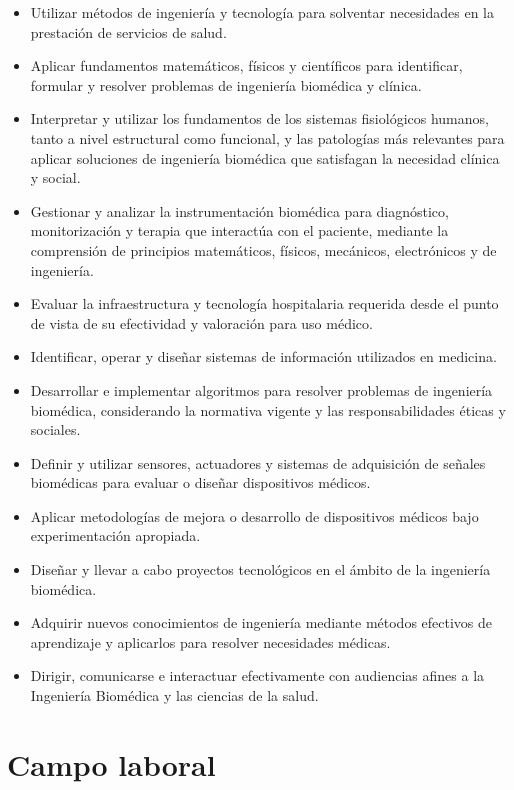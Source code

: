 \documentclass[10pt,letterpaper]{article}
\begin{document}
\begin{itemize}
  \item Utilizar métodos de ingeniería y tecnología para solventar necesidades en la prestación de servicios de salud.
  \item Aplicar fundamentos matemáticos, físicos y científicos para identificar, formular y resolver problemas de ingeniería biomédica y clínica.
  \item Interpretar y utilizar los fundamentos de los sistemas fisiológicos humanos, tanto a nivel estructural como funcional, y las patologías más relevantes para aplicar soluciones de ingeniería biomédica que satisfagan la necesidad clínica y social.
  \item Gestionar y analizar la instrumentación biomédica para diagnóstico, monitorización y terapia que interactúa con el paciente, mediante la comprensión de principios matemáticos, físicos, mecánicos, electrónicos y de ingeniería.
  \item Evaluar la infraestructura y tecnología hospitalaria requerida desde el punto de vista de su efectividad y valoración para uso médico.
  \item Identificar, operar y diseñar sistemas de información utilizados en medicina.
  \item Desarrollar e implementar algoritmos para resolver problemas de ingeniería biomédica, considerando la normativa vigente y las responsabilidades éticas y sociales.
  \item Definir y utilizar sensores, actuadores y sistemas de adquisición de señales biomédicas para evaluar o diseñar dispositivos médicos.
  \item Aplicar metodologías de mejora o desarrollo de dispositivos médicos bajo experimentación apropiada.
  \item Diseñar y llevar a cabo proyectos tecnológicos en el ámbito de la ingeniería biomédica.
  \item Adquirir nuevos conocimientos de ingeniería mediante métodos efectivos de aprendizaje y aplicarlos para resolver necesidades médicas.
  \item Dirigir, comunicarse e interactuar efectivamente con audiencias afines a la Ingeniería Biomédica y las ciencias de la salud.
\end{itemize}

\section*{Campo laboral}
\end{document}
